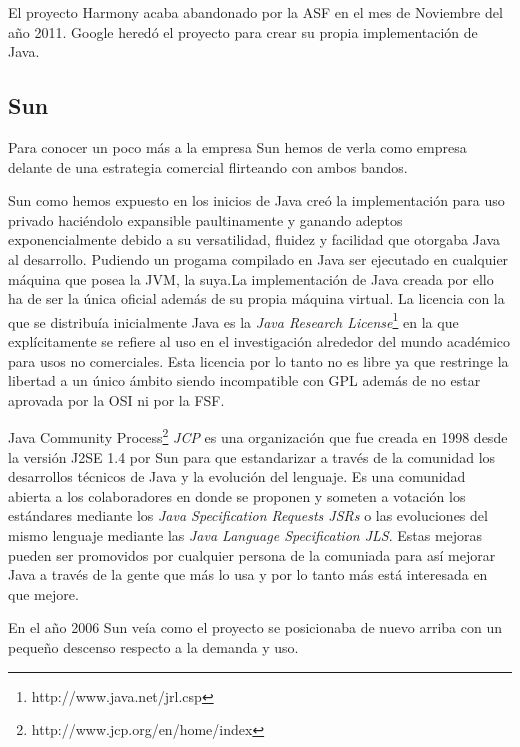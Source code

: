 \documentclass[11pt]{scrartcl}
\begin{document}
El proyecto Harmony acaba abandonado por la ASF en el mes de Noviembre del año 2011. Google heredó el proyecto para crear su propia implementación de Java. 

\subsection{Sun}

Para conocer un poco más a la empresa Sun hemos de verla como empresa delante de una estrategia comercial flirteando con ambos bandos.

Sun como hemos expuesto en los inicios de Java creó la implementación para uso privado haciéndolo expansible paultinamente y ganando adeptos exponencialmente debido a su versatilidad, fluidez y facilidad que otorgaba Java al desarrollo. Pudiendo un progama compilado en Java ser ejecutado en cualquier máquina que posea la JVM, la suya.La implementación de Java creada por ello ha de ser la única oficial además de su propia máquina virtual.
La licencia con la que se distribuía inicialmente Java es la \emph{Java Research License}\footnote{http://www.java.net/jrl.csp} en la que explícitamente se refiere al uso en el investigación alrededor del mundo académico para usos no comerciales. Esta licencia por lo tanto no es libre ya que restringe la libertad a un único ámbito siendo incompatible con GPL además de no estar aprovada por la OSI ni por la FSF.

Java Community Process\footnote{http://www.jcp.org/en/home/index} \emph{JCP} es una organización que fue creada en 1998 desde la versión J2SE 1.4 por Sun para que estandarizar a través de la comunidad los desarrollos técnicos de Java y la evolución del lenguaje. Es una comunidad abierta a los colaboradores en donde se proponen y someten a votación los estándares mediante los \emph{Java Specification Requests JSRs} o las evoluciones del mismo lenguaje mediante las \emph{Java Language Specification JLS}. Estas mejoras pueden ser promovidos por cualquier persona de la comuniada para así mejorar Java a través de la gente que más lo usa y por lo tanto más está interesada en que mejore.

En el año 2006 Sun veía como el proyecto se posicionaba de nuevo arriba con un pequeño descenso respecto a la demanda y uso.
\end{document}
